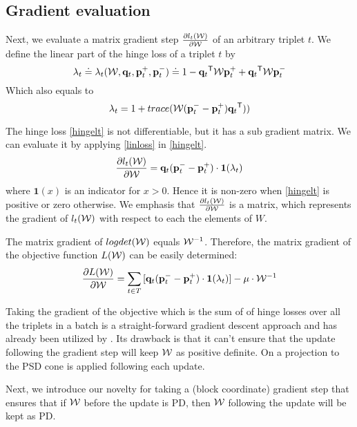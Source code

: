 \documentclass{article}
\begin{document}
\subsection{Gradient evaluation}
Next, we evaluate a matrix gradient step  $\frac{\partial {l_t (\mathcal{W})}}{\partial \mathcal{W}}$ of an arbitrary triplet $t$. We define the linear part of the hinge loss of a triplet $t$ by
\begin{equation}
\lambda_t \doteq \lambda_t(\mathcal{W}, \mathbf{q}_t, \mathbf{p}_{t}^{+}, \mathbf{p}_{t}^{-}) \doteq 1-\mathbf{q}_{t}{}^\mathsf{T} \mathcal{W} \mathbf{p}_{t}^{+}+\mathbf{q}_{t}{}^\mathsf{T}\mathcal{W}\mathbf{p}_{t}^{-}
\end{equation}
Which also equals to
\begin{equation}
\lambda_t = 1+trace(\mathcal{W}(\mathbf{p}_{t}^{-} - \mathbf{p}_{t}^{+})\mathbf{q}_{t}{}^\mathsf{T}))
\label{linloss}
\end{equation}

The hinge loss \eqref{hingelt} is not differentiable, but it has a sub gradient matrix. We can evaluate it by applying \eqref{linloss} in \eqref{hingelt}.
\begin{equation}
\frac{\partial {l_t (\mathcal{W})}}{\partial \mathcal{W}} = \mathbf{q}_{t}(\mathbf{p}_{t}^{-} - \mathbf{p}_{t}^{+}) \cdot \textbf{1}(\lambda_t)
\end{equation}
where $\textbf{1}(x)$ is an indicator for $x>0$. Hence it is non-zero when \eqref{hingelt} is positive or zero otherwise. We emphasis that 
$\frac{\partial {l_t (\mathcal{W})}}{\partial \mathcal{W}}$ is a matrix, which represents the gradient of $l_t(\mathcal{W})$ with respect to each the elements of $W$.

The matrix gradient of $logdet(\mathcal{W})$ equals $\mathcal{W}^{-1}$. Therefore, the matrix gradient of the objective function $L(\mathcal{W})$ can be easily determined: 
\begin{equation}
\frac{\partial {L (\mathcal{W})}}{\partial \mathcal{W}} = \sum\limits_{t\in T}{[\mathbf{q}_{t}(\mathbf{p}_{t}^{-} - \mathbf{p}_{t}^{+}) \cdot \textbf{1}(\lambda_t)]} - \mu \cdot \mathcal{W}^{-1}
\end{equation}

Taking the gradient of the objective which is the sum of of hinge losses over all the triplets in a batch is a straight-forward gradient descent approach and has already been utilized by \cite{qian}. Its drawback is that it can't ensure that the update following the gradient step will keep $\mathcal{W}$ as positive definite. On \cite{qian} a projection to the PSD cone is applied following each update. 

Next, we introduce our novelty for taking a (block coordinate) gradient step that ensures that if $\mathcal{W}$ before the update is PD, then $\mathcal{W}$ following the update will be kept as PD.
\end{document}
